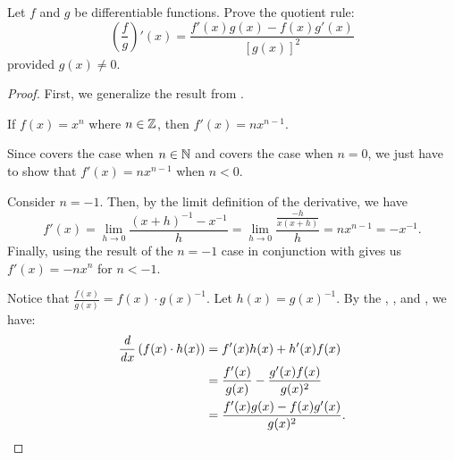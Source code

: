\begin{problem}
  Let $f$ and $g$ be differentiable functions. Prove the quotient rule:
    \begin{equation*}
      \left(\frac{f}{g}\right)' (x) = \frac{f'(x)g(x) - f(x)g'(x)}{[g(x)]^2}
    \end{equation*}
  provided $g(x) \neq 0$.

  \begin{proof}
    First, we generalize the result from .
    \begin{theorem}
      \label{thm:derivative-power-rule-integers}
      If $f(x) = x^{n}$ where $n \in \mathbb{Z}$, then $f'(x) = nx^{n-1}$.
    \end{theorem}

    \begin{subproof}
      Since  covers the case when $n \in \mathbb{N}$
      and  covers the case when $n = 0$, we just have to show that
      $f'(x) = nx^{n-1}$ when $n < 0$.

      Consider $n = -1$. Then, by the limit definition of the derivative, we have
      \[
        f'(x) = \lim_{h \to 0} \frac{(x + h)^{-1} - x^{-1}}{h} = \lim_{h \to 0} \frac{\frac{-h}{x(x + h)}}{h} = nx^{n-1} = -x^{-1}.
      \]
      Finally, using the result of the $n = -1$ case in conjunction with  gives us
      $f'(x) = -nx^{n}$ for $n < -1$.
    \end{subproof}

    Notice that $\frac{f(x)}{g(x)} = f(x) \cdot g(x)^{-1}$.
    Let $h(x) = g(x)^{-1}$. By the , , and
    , we have:
    \begin{align*}
        \dfrac{\mathit{d} }{\mathit{d} x} \left( f(x) \cdot {h(x)} \right) &= f'(x)h(x) + h'(x)f(x)\\
                                                    &= \frac{f'(x)}{g(x)} -\frac{g'(x) f(x)}{g(x)^{2}}\\
                                                    &= \frac{f'(x) g(x) - f(x) g'(x)} {g(x)^2}.
    \end{align*}
  \end{proof}

\end{problem}

